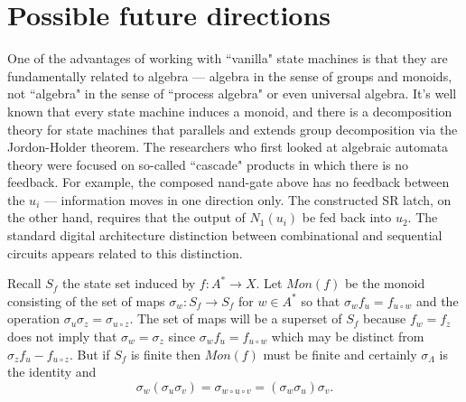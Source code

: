 \documentclass[runningheads,letter]{llncs}
\newcommand{\ess}{\Lambda}
\newcommand{\conc}{\circ}
\begin{document}
\section{Possible future directions\label{sec:conjecture}}


One of the advantages of working with ``vanilla" state machines is that they are fundamentally related to algebra --- algebra in the sense of groups and monoids, not ``algebra" in the sense of ``process algebra" or even universal algebra. It's
well known that every state machine induces a monoid, and there is a decomposition theory for state machines that parallels
and extends group decomposition via the Jordon-Holder theorem.  The researchers who first looked at algebraic automata
theory were focused on so-called ``cascade" products in which there is no feedback\cite{Arbibabs,Holcombe,ginzburg}.
For example, the composed nand-gate
above has no feedback between the $u_i$ --- information moves in one direction only. The constructed SR latch, on the
other hand, requires that the output of $N_1(u_i)$ be fed back into $u_2$. The standard digital architecture distinction
between combinational and sequential circuits appears related to this distinction. 

Recall $S_f$ the state set induced by $f:A^*\to X$. Let $Mon(f)$ be the monoid consisting
of the set of maps
$\sigma_w:S_f\to S_f$ for $w\in A^*$ so that $\sigma_w f_u = f_{u\conc w}$ and the operation
$\sigma_u\sigma_z = \sigma_{u\conc z}$. The set of maps will be a superset of $S_f$ because
$f_w = f_z$ does not imply that $\sigma_w = \sigma_z$ since $\sigma_w f_u = f_{u\conc w}$ which
may be distinct from $\sigma_z f_u - f_{u\conc z}$. But if $S_f$ is finite then $Mon(f)$ must be
finite and certainly $\sigma_\ess$ is the identity and
$$\sigma_w (\sigma_u \sigma_v)=\sigma_{w\conc u \conc v} = (\sigma_w \sigma_u)\sigma_v.$$
\end{document}
